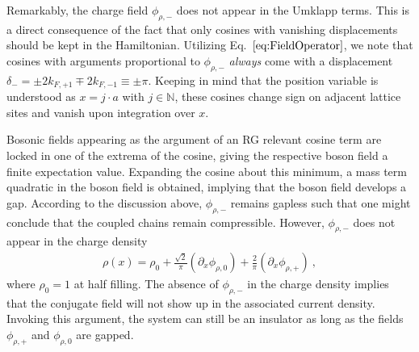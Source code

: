 \documentclass[twocolumn, prl, aps, floatfix, superscriptaddress, longbibliography]{revtex4-1}
\begin{document}
Remarkably, the charge field $\phi_{\rho,-}$ does not appear in the Umklapp terms. This is a direct consequence of the fact that  only cosines with vanishing displacements should be kept in the Hamiltonian. Utilizing Eq.~$\eqref{eq:FieldOperator}$, we note that cosines with arguments proportional to $\phi_{\rho,-} $ \textit{always} come with a displacement $\delta_{-} = \pm2k_{F,+1} \mp 2k_{F,-1} \equiv \pm \pi$. Keeping in mind that the position variable is understood as $x = j\cdot a$ with $j\in \mathbb{N}$, these cosines change sign on adjacent lattice sites and vanish upon integration over $x$. 

Bosonic fields appearing as the argument of an RG relevant cosine term are locked in one of the extrema of the cosine, giving the respective boson field a finite expectation value. Expanding the cosine about this minimum, a mass term quadratic in the boson field is obtained, implying that the boson field develops a gap. According to the discussion above, $\phi_{\rho,-}$ remains gapless such that one might conclude that the coupled chains remain compressible. However, $\phi_{\rho,-}$ does not appear in the charge density
%
\begin{align} \label{eq:ChargeDensity}
	\rho(x) = \rho_0 +\frac{\sqrt{2}}{\pi} \left(\partial_x\phi_{\rho,0} \right) + \frac{2}{\pi} \left(\partial_x\phi_{\rho,+} \right)  \ ,
\end{align}
%
where $\rho_0 = 1$ at half filling. The absence of $\phi_{\rho,-}$ in the charge density implies that the conjugate field will not show up in the associated current density. Invoking this argument, the system can still be an insulator as long as the fields $\phi_{\rho,+}$ and $\phi_{\rho,0}$ are gapped. 
\end{document}
